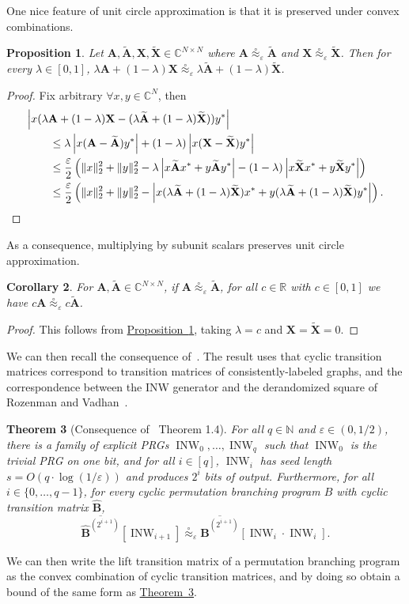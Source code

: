 \documentclass[11pt]{article}
\numberwithin{equation}{section}
\newtheorem{theorem}{Theorem}[section]
\newtheorem{proposition}[theorem]{Proposition}
\newtheorem{corollary}[theorem]{Corollary}
\theoremstyle{definition}
\theoremstyle{plain}
\newcommand{\C}{\mathbb C}
\newcommand{\R}{\mathbb R}
\newcommand{\N}{\mathbb N}
\newcommand{\expref}[2]{\hyperref[#2]{#1~\ref{#2}}}
\newcommand{\eps}{\varepsilon}
\newcommand{\mX}{\mathbf{X}}
\newcommand{\mA}{\mathbf{A}}
\newcommand{\mtA}{\widetilde{\mA}}
\newcommand{\mtX}{\widetilde{\mX}}
\DeclareMathOperator{\INW}{INW}
\newcommand{\hbp}{{\mathbf{\hat{B}}}}
\newcommand{\hbbp}[2]{\overline{\mathbf{\hat{B}}^{(#1)}}\left[#2\right]}
\newcommand{\uc}{\stackrel{\circ}{\approx}}
\begin{document}
One nice feature of unit circle approximation is that it is preserved under convex combinations. %
\begin{proposition}\label{prop:UCavg}
    Let $\mA,\mtA ,\mX,\mtX\in \C^{N\times N}$ where $\mA\uc_\eps \mtA$ and $\mX \uc_\eps \mtX$. Then for every $\lambda\in [0,1]$, $\lambda \mA+(1-\lambda)\mX  \uc_\eps \lambda \mtA+(1-\lambda)\mtX$. %
\end{proposition}
\begin{proof}
    Fix arbitrary $\forall x,y \in \C^N$, then
    \begin{align*}
        \MoveEqLeft{\left| x(\lambda \mA+(1-\lambda)\mX -(\lambda \mtA+(1-\lambda)\mtX))y^* \right|}\\
        &\leq \lambda\left|x(\mA-\mtA)y^*\right|+(1-\lambda)\left|x(\mX -\mtX)y^*\right|\\
        &\leq \frac{\eps}{2}\left(\|x\|_2^2+\|y\|_2^2 - \lambda \left|x\mtA x^*+y\mtA y^*\right|-(1-\lambda)\left|x\mtX x^*+y\mtX y^*\right|\right)\\
        &\leq \frac{\eps}{2}\left(\|x\|_2^2+\|y\|_2^2 - \left|x(\lambda \mtA +(1-\lambda)\mtX )x^*+y(\lambda \mtA +(1-\lambda)\mtX )y^*\right|\right). \qedhere
    \end{align*}
\end{proof}
As a consequence, multiplying by subunit scalars preserves unit circle approximation.
\begin{corollary}\label{cor:UCscale}
    For $\mA,\mtA \in \C^{N\times N}$, if $\mA\uc_\eps \mtA$, for all $c \in \R$ with $c\in[0,1]$ we have $c\mA\uc_\eps c\mtA$.
\end{corollary}
\begin{proof}
    This follows from \expref{Proposition}{prop:UCavg}, taking $\lambda=c$ and $\mX=\mtX=0$.
\end{proof}
    
    We can then recall the consequence of~\cite{HozaPyVa21}. The result uses that cyclic transition matrices correspond to transition matrices of consistently-labeled graphs, and the correspondence between the INW generator and the derandomized square of Rozenman and Vadhan~\cite{RozenmanVa05}.
\begin{theorem}[Consequence of~\cite{HozaPyVa21} Theorem 1.4]\label{thm:HozaPyVa21gen}
    For all $q \in \N$ and $\eps \in (0,1/2)$, there is a family of explicit PRGs $\INW_0,\ldots,\INW_q$ such that $\INW_0$ is the trivial PRG on one bit, and for all $i\in [q]$, $\INW_i$ has seed length $s=O(q\cdot\log(1/\eps))$ and produces $2^i$ bits of output. Furthermore, for all $i \in \{0,\ldots,q-1\}$, for every cyclic permutation branching program $B$ with cyclic transition matrix $\hbp$,
    \[\hbbp{2^{i+1}}{\INW_{i+1}}\uc_{\eps} \hbbp{2^{i+1}}{\INW_i\cdot\INW_i}.\]
\end{theorem}
We can then write the lift transition matrix of a permutation branching program as the convex combination of cyclic transition matrices, and by doing so obtain a bound of the same form as \expref{Theorem}{thm:HozaPyVa21gen}.
\end{document}

